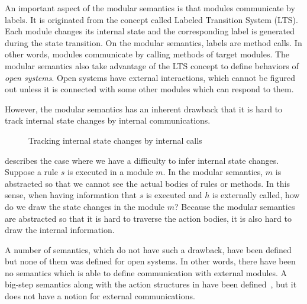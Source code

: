 An important aspect of the modular semantics is that modules
communicate by labels. It is originated from the concept called
Labeled Transition System (LTS). Each module changes its internal
state and the corresponding label is generated during the state
transition. On the modular semantics, labels are method calls. In
other words, modules communicate by calling methods of target modules.
The modular semantics also take advantage of the LTS concept to define
behaviors of \emph{open systems}. Open systems have external
interactions, which cannot be figured out unless it is connected with
some other modules which can respond to them.

However, the modular semantics has an inherent drawback that it is hard
to track internal state changes by internal communications.
\begin{figure}[t]
  \caption{Tracking internal state changes by internal calls}
  \label{ex-modular-semantics-disadvantage}
\end{figure}
 describes the case where we
have a difficulty to infer internal state changes. Suppose a rule $s$
is executed in a module $m$. In the modular semantics, $m$ is
abstracted so that we cannot see the actual bodies of rules or
methods. In this sense, when having information that $s$ is executed
and $h$ is externally called, how do we draw the state changes in the
module $m$? Because the modular semantics are abstracted so that it is
hard to traverse the action bodies, it is also hard to draw the
internal information.

A number of semantics, which do not have such a drawback, have been
defined but none of them was defined for open systems. In other words,
there have been no semantics which is able to define communication
with external modules. A big-step semantics along with the action
structures in \Bluespec{} have been defined~\cite{nirav-memocode}, but
it does not have a notion for external communications.

